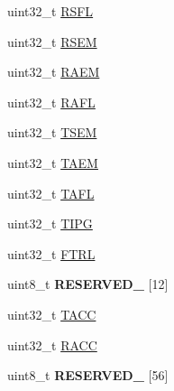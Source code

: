 \begin{DoxyCompactItemize}
\item 
uint32\+\_\+t \hyperlink{struct_e_n_e_t___mem_map_aec8499ed3e3703b3b6582cb99ccdf01b}{R\+S\+F\+L}
\item 
uint32\+\_\+t \hyperlink{struct_e_n_e_t___mem_map_a7b29420fd912f2263789017ce0b60b26}{R\+S\+E\+M}
\item 
uint32\+\_\+t \hyperlink{struct_e_n_e_t___mem_map_a0cb46a60ee6f66278066bd85b782756c}{R\+A\+E\+M}
\item 
uint32\+\_\+t \hyperlink{struct_e_n_e_t___mem_map_a52027d938a843a1f4c58808e15ad7a39}{R\+A\+F\+L}
\item 
uint32\+\_\+t \hyperlink{struct_e_n_e_t___mem_map_a8cb50de4da08a100de4f82ddc5f4eb9e}{T\+S\+E\+M}
\item 
uint32\+\_\+t \hyperlink{struct_e_n_e_t___mem_map_ae633a0daa87c4d55ec4f4b07a6a336cc}{T\+A\+E\+M}
\item 
uint32\+\_\+t \hyperlink{struct_e_n_e_t___mem_map_a4229a0d53dc34b8f964fb5889860293d}{T\+A\+F\+L}
\item 
uint32\+\_\+t \hyperlink{struct_e_n_e_t___mem_map_a33c2b64aa493e8e381cd207ac9c6e8ec}{T\+I\+P\+G}
\item 
uint32\+\_\+t \hyperlink{struct_e_n_e_t___mem_map_a810941b10afea757173e9807b8ee28f6}{F\+T\+R\+L}
\item 
\hypertarget{struct_e_n_e_t___mem_map_a454a3e687f1884a149c004467f818d5b}{}uint8\+\_\+t {\bfseries R\+E\+S\+E\+R\+V\+E\+D\+\_} \mbox{[}12\mbox{]}\label{struct_e_n_e_t___mem_map_a454a3e687f1884a149c004467f818d5b}

\item 
uint32\+\_\+t \hyperlink{struct_e_n_e_t___mem_map_a7215c1d9494a9cdba3959c6b7626e9c6}{T\+A\+C\+C}
\item 
uint32\+\_\+t \hyperlink{struct_e_n_e_t___mem_map_a6d7268a1bc80a6556ec3169866616a5a}{R\+A\+C\+C}
\item 
\hypertarget{struct_e_n_e_t___mem_map_a3af67dfbad2943f9ef70476bfe449c59}{}uint8\+\_\+t {\bfseries R\+E\+S\+E\+R\+V\+E\+D\+\_} \mbox{[}56\mbox{]}\label{struct_e_n_e_t___mem_map_a3af67dfbad2943f9ef70476bfe449c59}


\end{DoxyCompactItemize}
